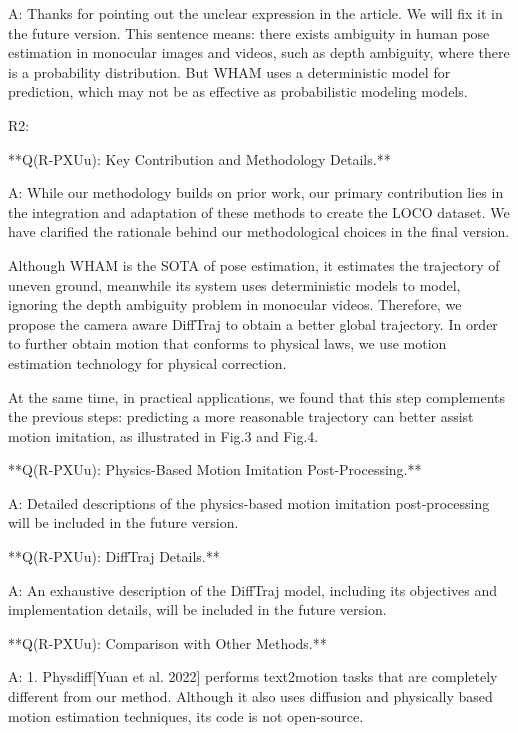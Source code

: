 \documentclass{article}
\begin{document}
\begin{markdown}
A: Thanks for pointing out the unclear expression in the article. We will fix it in the future version. This sentence means: there exists ambiguity in human pose estimation in monocular images and videos, such as depth ambiguity, where there is a probability distribution. But WHAM uses a deterministic model for prediction, which may not be as effective as probabilistic modeling models.

R2:


**Q(R-PXUu): Key Contribution and Methodology Details.**

A: While our methodology builds on prior work, our primary contribution lies in the integration and adaptation of these methods to create the LOCO dataset. We have clarified the rationale behind our methodological choices in the final version.

Although WHAM is the SOTA of pose estimation, it estimates the trajectory of uneven ground, meanwhile its system uses deterministic models to model, ignoring the depth ambiguity problem in monocular videos. Therefore, we propose the camera aware DiffTraj to obtain a better global trajectory. In order to further obtain motion that conforms to physical laws, we use motion estimation technology for physical correction. 

At the same time, in practical applications, we found that this step complements the previous steps: predicting a more reasonable trajectory can better assist motion imitation, as illustrated in Fig.3 and Fig.4.

**Q(R-PXUu): Physics-Based Motion Imitation Post-Processing.**

A: Detailed descriptions of the physics-based motion imitation post-processing will be included in the future version.


**Q(R-PXUu): DiffTraj Details.**

A: An exhaustive description of the DiffTraj model, including its objectives and implementation details, will be included in the future version.


**Q(R-PXUu): Comparison with Other Methods.**

A: 1. Physdiff[Yuan et al. 2022] performs text2motion tasks that are completely different from our method. Although it also uses diffusion and physically based motion estimation techniques, its code is not open-source.


\end{markdown}
\end{document}
